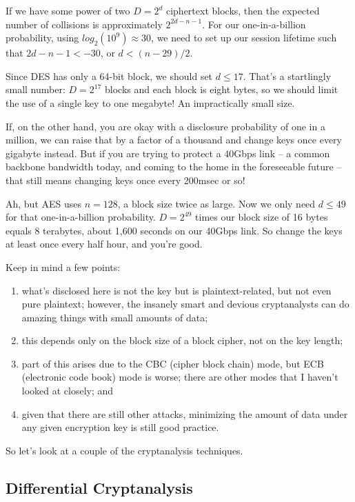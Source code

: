 If we have some power of two $D = 2^d$ ciphertext blocks, then the
expected number of collisions is approximately $2^{2d-n-1}$.  For our
one-in-a-billion probability, using $log_2(10^9) \approx 30$, we need
to set up our session lifetime such that $2d-n-1 < -30$, or $d <
(n-29)/2$.

Since DES has only a 64-bit block, we should set $d \le 17$.  That's a
startlingly small number: $D = 2^{17}$ blocks and each block is eight
bytes, so we should limit the use of a single key to one megabyte!
An impractically small size.

If, on the other hand, you are okay with a disclosure probability of
one in a million, we can raise that by a factor of a thousand and
change keys once every gigabyte instead.  But if you are trying to
protect a 40Gbps link -- a common backbone bandwidth today, and coming
to the home in the foreseeable future -- that still means changing
keys once every 200msec or so!

Ah, but AES uses $n = 128$, a block size twice as large.  Now we only
need $d \le 49$ for that one-in-a-billion probability.  $D = 2^{49}$
times our block size of 16 bytes equals 8 terabytes, about 1,600
seconds on our 40Gbps link.  So change the keys at least once every
half hour, and you're good.

Keep in mind a few points:
\begin{enumerate}
\item what's disclosed here is not the key but is plaintext-related, but
   not even pure plaintext; however, the insanely smart and devious
   cryptanalysts can do amazing things with small amounts of data;
\item this depends only on the block size of a block cipher, not on the
   key length;
\item part of this arises due to the CBC (cipher block chain) mode, but
   ECB (electronic code book) mode is worse; there are other modes
   that I haven't looked at closely; and
\item given that there are still other attacks, minimizing the amount of
   data under any given encryption key is still good practice.
\end{enumerate}

So let's look at a couple of the cryptanalysis techniques.

\subsection{Differential Cryptanalysis}

